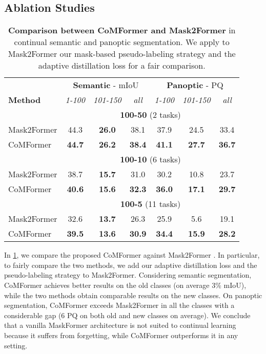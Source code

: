 \documentclass[10pt,twocolumn,letterpaper]{article}
\begin{document}
\subsection{Ablation Studies}
\begin{table}[t]
    \centering
    \small
    \setlength{\tabcolsep}{3pt} \begin{tabular}{l|ccc|ccc}
    \hline
\multicolumn{1}{c}{} & \multicolumn{3}{c}{\textbf{Semantic} - mIoU} & \multicolumn{3}{c}{\textbf{Panoptic} - PQ}\\
\textbf{Method} & \textit{1-100} & \textit{101-150} & \textit{all} & \textit{1-100} & \textit{101-150} & \textit{all}\\ \hline
\multicolumn{1}{c|}{} & \multicolumn{6}{c}{\textbf{100-50} (2 tasks)} \\  \hline
Mask2Former & 44.3	& \textbf{26.0} & 38.1	&       37.9 &	24.5	&	33.4 \\
CoMFormer   & \textbf{44.7}	& \textbf{26.2} & \textbf{38.4}	&       \textbf{41.1} &	\textbf{27.7}	&	\textbf{36.7} \\ \hline
\multicolumn{1}{c|}{} & \multicolumn{6}{c}{\textbf{100-10} (6 tasks)} \\  \hline
Mask2Former & 38.7 &	\textbf{15.7}	& 31.0 &	30.2	& 10.8		& 23.7 \\
CoMFormer   & \textbf{40.6} &	\textbf{15.6}	& \textbf{32.3} &	\textbf{36.0}	& \textbf{17.1}		& \textbf{29.7} \\ \hline
\multicolumn{1}{c|}{} & \multicolumn{6}{c}{\textbf{100-5} (11 tasks)}  \\  \hline
Mask2Former & 32.6	& \textbf{13.7} &	26.3 &	25.9	&  5.6 &	19.1 \\
CoMFormer   &\textbf{ 39.5}	& \textbf{13.6} &	\textbf{30.9} &	\textbf{34.4}	& \textbf{15.9} &	\textbf{28.2} \\ \hline
\end{tabular}
\caption{\textbf{Comparison between CoMFormer and Mask2Former} \cite{cheng2021masked} in continual semantic and panoptic segmentation. We apply to Mask2Former our mask-based pseudo-labeling strategy and the adaptive distillation loss for a fair comparison.} \label{tab:ablation_m2f}
\end{table}
 \vspace{-1em} 
In \cref{tab:ablation_m2f}, we compare the proposed CoMFormer against Mask2Former \cite{cheng2021masked}. In particular, to fairly compare the two methods, we add our adaptive distillation loss and the pseudo-labeling strategy to Mask2Former. Considering semantic segmentation, CoMFormer achieves better results on the old classes (on average 3\% mIoU), while the two methods obtain comparable results on the new classes. On panoptic segmentation, CoMFormer exceeds Mask2Former in all the classes with a considerable gap (6 PQ on both old and new classes on average). We conclude that a vanilla MaskFormer architecture is not suited to continual learning because it suffers from forgetting, while CoMFormer outperforms it in any setting. 
\end{document}
